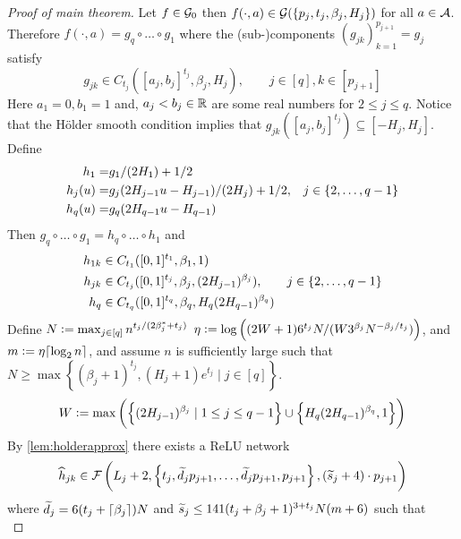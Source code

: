 \begin{proof}[Proof of main theorem]
  Let $f \in \mathcal{G}_0$ then $f(\cdot, a) \in
  \mathcal{G}(\{p_j, t_j, \beta_j, H_j\})$ for all $a \in \mathcal{A}$.
  Therefore $f(\cdot, a) = g_q \circ \dots \circ g_1$ where
  the (sub-)components $(g_{jk})_{k=1}^{p_{j+1}} = g_j$ satisfy
  \begin{equation}
    g_{jk} \in C_{t_j}([a_j, b_j]^{t_j}, \beta_j, H_j)
    , \qquad j \in [q], k \in [p_{j+1}]
  \end{equation}
  Here $a_1 = 0, b_1=1$ and,
  $a_j < b_j \in \mathbb{R}$ are some real numbers for $2 \leq j \leq q$.
  Notice that the Hölder smooth condition implies that
  $g_{jk}([a_j, b_j]^{t_j}) \subseteq [-H_j, H_j]$.
  Define
  \begin{align}
    h_1 = & g_1/(2H_1) + 1/2 \notag
    \\ h_j(u) = & g_j(2H_{j-1} u - H_{j-1})/(2H_j) + 1/2,
    & j \in \{2, \dots, q-1\} \notag
    \\ h_q(u) = & g_q(2H_{q-1}u - H_{q-1})
  \end{align}
  Then $g_q \circ \dots \circ g_1 = h_q \circ \dots \circ h_1$ and
  \begin{align}
    h_{1k} \in &\; C_{t_1}([0,1]^{t_1}, \beta_1, 1) \notag
    \\ h_{jk} \in &\; C_{t_j}([0,1]^{t_j}, \beta_j, (2H_{j-1})^{\beta_j}),
    & j \in \{2, \dots, q-1\} \notag
    \\ h_q \in &\; C_{t_q}([0,1]^{t_q}, \beta_q, H_q(2H_{q-1})^{\beta_q})
  \end{align}
  Define %
  $N \vcentcolon= \max_{j \in [q]} n^{t_j/(2 \beta^*_j + t_j)}$
  $\eta \vcentcolon= \log \left((2W + 1) 6^{t_j} N
  / (W 3^{\beta_j} N^{-\beta_j/t_j}) \right)$,
  and $m \vcentcolon= \eta \lceil\log_2 n\rceil$,
  and assume $n$ is sufficiently large such that
  $N \geq \max \left\{ (\beta_j + 1)^{t_j},
  (H_j+1)e^{t_j} \mid j \in [q] \right\}$.
  \begin{equation}
    W \vcentcolon= \max \left( \left\{ (2 H_{j-1})^{\beta_j} \mid 1\leq j\leq q-1 \right\}
    \cup \left\{ H_q(2H_{q-1})^{\beta_q}, 1\right\} \right)
  \end{equation}
  By \cref{lem:holderapprox} there exists a ReLU network
  \begin{equation}
    \widehat{h}_{jk} \in \mathcal{F} \left( L_j + 2, \left\{ t_j, \widetilde{d}_j p_{j+1}, \dots,
    \widetilde{d}_j p_{j+1}, p_{j+1} \right\}, (\widetilde{s}_j + 4) \cdot p_{j+1} \right)
  \end{equation}
  where $\widetilde{d}_j = 6(t_j + \lceil\beta_j\rceil)N$ and
  $\widetilde{s}_j \leq 141 (t_j + \beta_j + 1)^{3 + t_j} N (m + 6)$
  such that
  \begin{equation}

\end{equation}
\end{proof}
